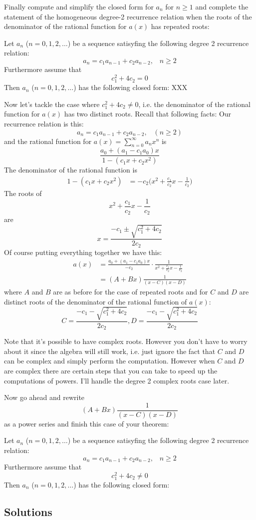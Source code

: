 Finally compute and simplify the closed form for
$a_n$ for $n \geq 1$ 
and complete the statement of the homogeneous
degree-2 recurrence relation
when the roots of the denominator of the rational function
for $a(x)$ has repeated roots:

\begin{thm}
Let $a_n$ ($n = 0, 1, 2, \ldots$) be a sequence satisyfing the following
degree 2 recurrence relation:
\[
a_n = c_1 a_{n-1} + c_2 a_{n-2}, \,\,\,\,\, n \geq 2
\]
Furthermore assume that
\[
c_1^2 + 4c_2 = 0
\] 
Then $a_n$ ($n = 0, 1, 2, \ldots$) has the following closed form:
XXX
\end{thm}

Now let's tackle the case where $c_1^2 + 4c_2 \neq 0$,
i.e. the denominator of the rational function for $a(x)$
has two distinct roots.
Recall that following facts: Our recurrence relation is this:
\[
a_n = c_1 a_{n-1} + c_2 a_{n-2}, \,\,\,\,\, (n \geq 2)
\]
and the rational function for $a(x) = \sum_{n=0}^\infty a_n x^n$ is
\[
\frac
{a_0 + (a_1 - c_1 a_0) x}
{1 - (c_1 x + c_2 x^2)}
\]
The denominator of the rational function is
\begin{align*}
1 - (c_1 x + c_2 x^2)
&= -c_2 \biggl( x^2 + \frac{c_1}{c_2} x - \frac{1}{c_2} \biggr)
\end{align*}
The roots of
\[
x^2 + \frac{c_1}{c_2} x - \frac{1}{c_2}
\]
are
\[
x
=
\frac{-c_1 \pm \sqrt{c_1^2 + 4c_2}}{2c_2}
\]
Of course putting everything together we have this:
\begin{align*}
a(x) 
&=
\frac {a_0 + (a_1 - c_1 a_0) x} {-c_2} \cdot
\frac{1}{x^2 + \frac{c_1}{c_2} x - \frac{1}{c_2}} \\
&= (A + Bx) \frac{1}{(x-C)(x-D)}
\end{align*}
where $A$ and $B$ are as before for the case of repeated roots 
and for $C$ and $D$ are distinct roots of the
denominator of the rational function of $a(x)$:
\[
C = \frac{-c_1 - \sqrt{c_1^2 + 4c_2}}{2c_2},
D = \frac{-c_1 - \sqrt{c_1^2 + 4c_2}}{2c_2}
\]

Note that it's possible to have complex roots.
However you don't have to worry about it since the algebra will still work,
i.e. just ignore the fact that $C$ and $D$ can be complex and simply perform
the computation.
However when $C$ and $D$ are complex there are certain steps that you can take
to speed up the computations of powers.
I'll handle the degree 2 complex roots case later.

Now go ahead and rewrite 
\[
(A + Bx) \frac{1}{(x-C)(x-D)}
\] as a power series and finish this case of your theorem:

\begin{thm}
Let $a_n$ ($n = 0, 1, 2, \ldots$) be a sequence satisyfing the following
degree 2 recurrence relation:
\[
a_n = c_1 a_{n-1} + c_2 a_{n-2}, \,\,\,\,\, n \geq 2
\]
Furthermore assume that
\[
c_1^2 + 4c_2 \neq 0
\] 
Then $a_n$ ($n = 0, 1, 2, \ldots$) has the following closed form:
\vskip 2in
\end{thm}

\newpage
\subsection*{Solutions}

